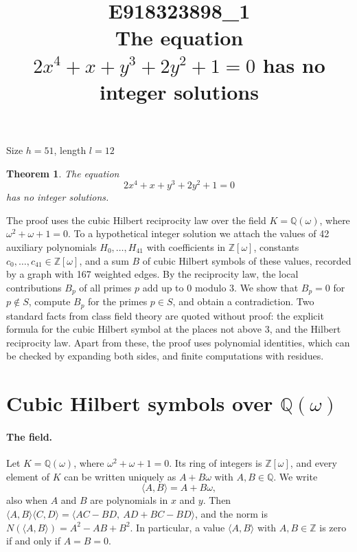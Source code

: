 \documentclass[11pt]{article}
\title{\textbf{E918323898\_1}\\[4pt] {\Large The equation $2x^{4}+x+y^{3}+2y^{2}+1=0$ has no integer solutions}}
\author{}
\date{}
\newtheorem{theorem}{Theorem}
\newcommand{\Z}{\mathbb{Z}}
\newcommand{\Q}{\mathbb{Q}}
\begin{document}
\maketitle
\vspace{-8ex}
\begin{center}
Size $h=51$, length $l=12$
\end{center}

\begin{theorem}\label{thm:main}
The equation
\begin{equation}\label{eq:main}
2x^{4}+x+y^{3}+2y^{2}+1=0
\end{equation}
has no integer solutions.
\end{theorem}

The proof uses the cubic Hilbert reciprocity law over the field $K=\Q(\omega)$, where $\omega^2+\omega+1=0$. To a hypothetical integer solution we attach the values of 42 auxiliary polynomials $H_0,\dots,H_{41}$ with coefficients in $\Z[\omega]$, constants $c_0,\dots,c_{41}\in\Z[\omega]$, and a sum $B$ of cubic Hilbert symbols of these values, recorded by a graph with 167 weighted edges. By the reciprocity law, the local contributions $B_p$ of all primes $p$ add up to $0$ modulo $3$. We show that $B_p=0$ for $p\notin S$, compute $B_p$ for the primes $p\in S$, and obtain a contradiction. Two standard facts from class field theory are quoted without proof: the explicit formula for the cubic Hilbert symbol at the places not above $3$, and the Hilbert reciprocity law. Apart from these, the proof uses polynomial identities, which can be checked by expanding both sides, and finite computations with residues.


\section{\texorpdfstring{Cubic Hilbert symbols over $\Q(\omega)$}{Cubic Hilbert symbols over Q(w)}}\label{sec:symbols}

\paragraph{The field.} Let $K=\Q(\omega)$, where $\omega^2+\omega+1=0$. Its ring of integers is $\Z[\omega]$, and every element of $K$ can be written uniquely as $A+B\omega$ with $A,B\in\Q$. We write
\[
\langle A,B\rangle=A+B\omega,
\]
also when $A$ and $B$ are polynomials in $x$ and $y$. Then $\langle A,B\rangle\langle C,D\rangle=\langle AC-BD,\ AD+BC-BD\rangle$, and the norm is $N(\langle A,B\rangle)=A^2-AB+B^2$. In particular, a value $\langle A,B\rangle$ with $A,B\in\Z$ is zero if and only if $A=B=0$.
\end{document}
